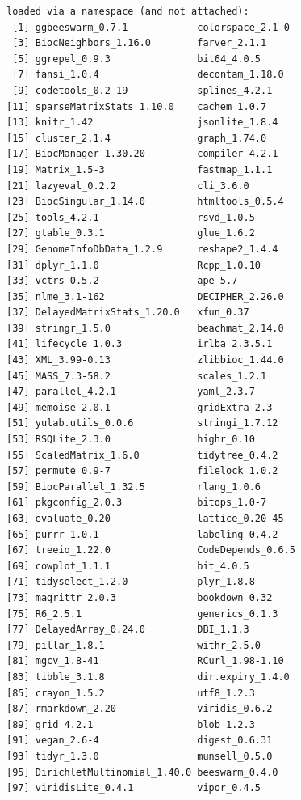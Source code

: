 \documentclass[
]{book}
\begin{document}
\begin{verbatim}
loaded via a namespace (and not attached):
 [1] ggbeeswarm_0.7.1            colorspace_2.1-0           
 [3] BiocNeighbors_1.16.0        farver_2.1.1               
 [5] ggrepel_0.9.3               bit64_4.0.5                
 [7] fansi_1.0.4                 decontam_1.18.0            
 [9] codetools_0.2-19            splines_4.2.1              
[11] sparseMatrixStats_1.10.0    cachem_1.0.7               
[13] knitr_1.42                  jsonlite_1.8.4             
[15] cluster_2.1.4               graph_1.74.0               
[17] BiocManager_1.30.20         compiler_4.2.1             
[19] Matrix_1.5-3                fastmap_1.1.1              
[21] lazyeval_0.2.2              cli_3.6.0                  
[23] BiocSingular_1.14.0         htmltools_0.5.4            
[25] tools_4.2.1                 rsvd_1.0.5                 
[27] gtable_0.3.1                glue_1.6.2                 
[29] GenomeInfoDbData_1.2.9      reshape2_1.4.4             
[31] dplyr_1.1.0                 Rcpp_1.0.10                
[33] vctrs_0.5.2                 ape_5.7                    
[35] nlme_3.1-162                DECIPHER_2.26.0            
[37] DelayedMatrixStats_1.20.0   xfun_0.37                  
[39] stringr_1.5.0               beachmat_2.14.0            
[41] lifecycle_1.0.3             irlba_2.3.5.1              
[43] XML_3.99-0.13               zlibbioc_1.44.0            
[45] MASS_7.3-58.2               scales_1.2.1               
[47] parallel_4.2.1              yaml_2.3.7                 
[49] memoise_2.0.1               gridExtra_2.3              
[51] yulab.utils_0.0.6           stringi_1.7.12             
[53] RSQLite_2.3.0               highr_0.10                 
[55] ScaledMatrix_1.6.0          tidytree_0.4.2             
[57] permute_0.9-7               filelock_1.0.2             
[59] BiocParallel_1.32.5         rlang_1.0.6                
[61] pkgconfig_2.0.3             bitops_1.0-7               
[63] evaluate_0.20               lattice_0.20-45            
[65] purrr_1.0.1                 labeling_0.4.2             
[67] treeio_1.22.0               CodeDepends_0.6.5          
[69] cowplot_1.1.1               bit_4.0.5                  
[71] tidyselect_1.2.0            plyr_1.8.8                 
[73] magrittr_2.0.3              bookdown_0.32              
[75] R6_2.5.1                    generics_0.1.3             
[77] DelayedArray_0.24.0         DBI_1.1.3                  
[79] pillar_1.8.1                withr_2.5.0                
[81] mgcv_1.8-41                 RCurl_1.98-1.10            
[83] tibble_3.1.8                dir.expiry_1.4.0           
[85] crayon_1.5.2                utf8_1.2.3                 
[87] rmarkdown_2.20              viridis_0.6.2              
[89] grid_4.2.1                  blob_1.2.3                 
[91] vegan_2.6-4                 digest_0.6.31              
[93] tidyr_1.3.0                 munsell_0.5.0              
[95] DirichletMultinomial_1.40.0 beeswarm_0.4.0             
[97] viridisLite_0.4.1           vipor_0.4.5                
\end{verbatim}
\end{document}
